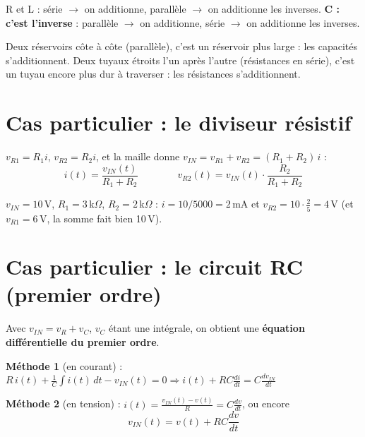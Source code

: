 \begin{warnbox}[title=Le piège classique]
R et L : série $\to$ on additionne, parallèle $\to$ on additionne les inverses. \textbf{C :
c'est l'inverse} : parallèle $\to$ on additionne, série $\to$ on additionne les inverses.
\end{warnbox}

\begin{goatbox}
Deux réservoirs côte à côte (parallèle), c'est un réservoir plus large : les capacités
s'additionnent. Deux tuyaux étroits l'un après l'autre (résistances en série), c'est un
tuyau encore plus dur à traverser : les résistances s'additionnent.
\end{goatbox}

\section{Cas particulier : le diviseur résistif}


\begin{thmbox}[title=Diviseur résistif]
$v_{R1} = R_1 i$, $v_{R2} = R_2 i$, et la maille donne
$v_{IN} = v_{R1} + v_{R2} = (R_1 + R_2)\,i$ :
\[ i(t) = \frac{v_{IN}(t)}{R_1 + R_2} \qquad\qquad
   v_{R2}(t) = v_{IN}(t)\cdot\frac{R_2}{R_1 + R_2} \]
\end{thmbox}

\begin{exbox}[title={Application numérique (exemple ajouté, pas dans les slides)}]
$v_{IN} = 10$\,V, $R_1 = 3$\,k$\Omega$, $R_2 = 2$\,k$\Omega$ :
$i = 10/5000 = 2$\,mA et $v_{R2} = 10\cdot\frac{2}{5} = 4$\,V (et $v_{R1} = 6$\,V,
la somme fait bien 10\,V).
\end{exbox}

\section{Cas particulier : le circuit RC (premier ordre)}


\begin{thmbox}[title=Circuit RC]
Avec $v_{IN} = v_R + v_C$, $v_C$ étant une intégrale, on obtient une \textbf{équation
différentielle du premier ordre}.

\textbf{Méthode 1} (en courant) :
$R\,i(t) + \frac1C\int i(t)\,dt - v_{IN}(t) = 0 \Rightarrow
 i(t) + RC\frac{di}{dt} = C\frac{dv_{IN}}{dt}$

\textbf{Méthode 2} (en tension) :
$i(t) = \frac{v_{IN}(t) - v(t)}{R} = C\frac{dv}{dt}$, ou encore
\[ v_{IN}(t) = v(t) + RC\frac{dv}{dt} \]
\end{thmbox}

